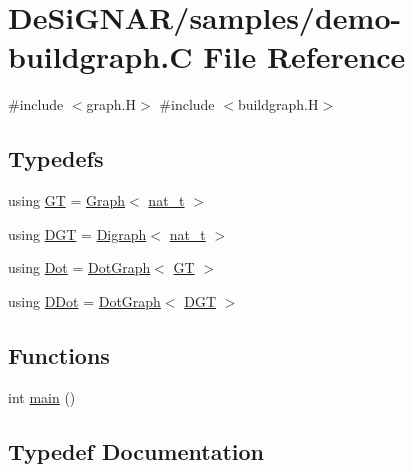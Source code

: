 \hypertarget{demo-buildgraph_8_c}{}\section{De\+Si\+G\+N\+A\+R/samples/demo-\/buildgraph.C File Reference}
\label{demo-buildgraph_8_c}
{\ttfamily \#include $<$graph.\+H$>$}\newline
{\ttfamily \#include $<$buildgraph.\+H$>$}\newline
\subsection*{Typedefs}
\begin{DoxyCompactItemize}
\item 
using \hyperlink{demo-buildgraph_8_c_a3001c40d2c31ca87ed96cd7d1334a55e}{GT} = \hyperlink{class_designar_1_1_graph}{Graph}$<$ \hyperlink{namespace_designar_aa72662848b9f4815e7bf31a7cf3e33d1}{nat\+\_\+t} $>$
\item 
using \hyperlink{demo-buildgraph_8_c_ae73e956c2a8cf0a58255aa6b659985e0}{D\+GT} = \hyperlink{class_designar_1_1_digraph}{Digraph}$<$ \hyperlink{namespace_designar_aa72662848b9f4815e7bf31a7cf3e33d1}{nat\+\_\+t} $>$
\item 
using \hyperlink{demo-buildgraph_8_c_a70657b0b48a4d69ef850be3c5517ecc2}{Dot} = \hyperlink{class_designar_1_1_dot_graph}{Dot\+Graph}$<$ \hyperlink{demo-buildgraph_8_c_a3001c40d2c31ca87ed96cd7d1334a55e}{GT} $>$
\item 
using \hyperlink{demo-buildgraph_8_c_a0ffdd103a7285712ccbd9548ff5544e7}{D\+Dot} = \hyperlink{class_designar_1_1_dot_graph}{Dot\+Graph}$<$ \hyperlink{demo-buildgraph_8_c_ae73e956c2a8cf0a58255aa6b659985e0}{D\+GT} $>$
\end{DoxyCompactItemize}
\subsection*{Functions}
\begin{DoxyCompactItemize}
\item 
int \hyperlink{demo-buildgraph_8_c_ae66f6b31b5ad750f1fe042a706a4e3d4}{main} ()
\end{DoxyCompactItemize}


\subsection{Typedef Documentation}
\mbox{\label{demo-buildgraph_8_c_a0ffdd103a7285712ccbd9548ff5544e7}} 
